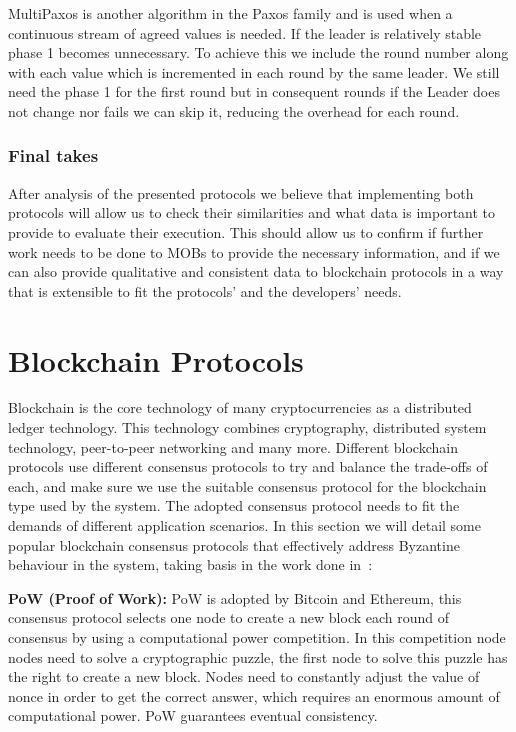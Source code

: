 MultiPaxos is another algorithm in the Paxos family and is used when a
continuous stream of agreed values is needed.
If the leader is relatively stable phase 1 becomes unnecessary. To achieve this
we include the round number along with each value which is incremented in each round
by the same leader. We still need the phase 1 for the first round but in
consequent rounds if the Leader does not change nor fails we can skip it, reducing
the overhead for each round.

\subsubsection{Final takes}\label{subsec:final_takes_consensus}

After analysis of the presented protocols we believe that implementing both protocols
will allow us to check their similarities and what data is important to provide
to evaluate their execution. This should allow us to confirm if further work
needs to be done to MOBs to provide the necessary information, and if we can also
provide qualitative and consistent data to blockchain protocols in a way that is
extensible to fit the protocols' and the developers' needs.

\section{Blockchain Protocols}\label{sec:blockchain}

Blockchain is the core technology of many cryptocurrencies as a distributed
ledger technology. This technology combines cryptography, distributed system
technology, peer-to-peer networking and many more. Different blockchain
protocols use different consensus protocols to try and balance the trade-offs of
each, and make sure we use the suitable consensus protocol for the blockchain type
used by the system. The adopted consensus protocol needs to fit the demands of
different application scenarios. In this section we will detail some popular
blockchain consensus protocols that effectively address Byzantine behaviour
in the system, taking basis in the work done in~\cite{blockchain_consensus}:

\textbf{PoW (Proof of Work):} PoW is adopted by Bitcoin and Ethereum,
this consensus protocol selects one node to create a new block 
each round of consensus by using a computational power competition. In this
competition node nodes need to solve a cryptographic puzzle, the first node to solve
this puzzle has the right to create a new block. Nodes need to constantly adjust the
value of nonce in order to get the correct answer, which requires an enormous amount
of computational power. PoW guarantees eventual consistency.

